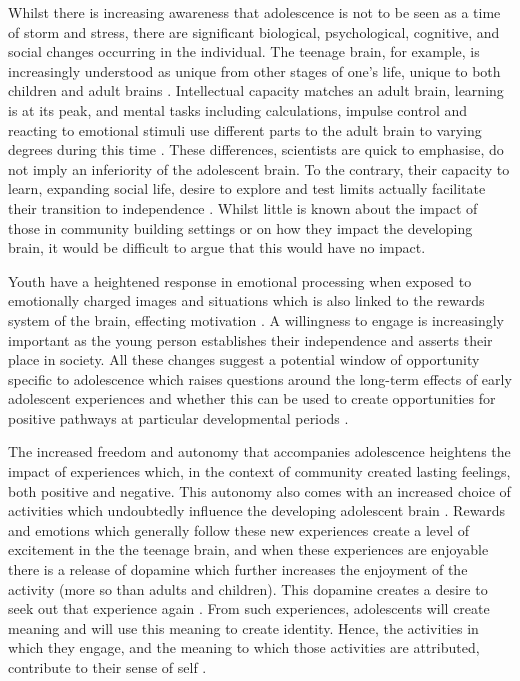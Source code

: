 Whilst there is increasing awareness that adolescence is not to be seen as a time of storm and stress, there are significant biological, psychological, cognitive, and social changes occurring in the individual. The teenage brain, for example, is increasingly understood as unique from other stages of one's life, unique to both children and adult brains \citep{Blakemore2012}. Intellectual capacity matches an adult brain, learning is at its peak, and mental tasks including calculations, impulse control and reacting to emotional stimuli use different parts to the adult brain to varying degrees during this time \citep{NationalInstituteofMentalHealth2011}. These differences, scientists are quick to emphasise, do not imply an inferiority of the adolescent brain. To the contrary, their capacity to learn, expanding social life, desire to explore and test limits actually facilitate their transition to independence \citep{NationalInstituteofMentalHealth2011}. Whilst little is known about the impact of those in community building settings or on how they impact the developing brain, it would be difficult to argue that this would have no impact. 

Youth have a heightened response in emotional processing when exposed to emotionally charged images and situations which is also linked to the rewards system of the brain, effecting motivation \citep{NationalInstituteofMentalHealth2011}. A willingness to engage is increasingly important as the young person establishes their independence and asserts their place in society. All these changes suggest a potential window of opportunity specific to adolescence which raises questions around the long-term effects of early adolescent experiences and whether this can be used to create opportunities for positive pathways at particular developmental periods \citep{Dahl2004}. 

The increased freedom and autonomy that accompanies adolescence heightens the impact of experiences which, in the context of community created lasting feelings, both positive and negative. This autonomy also comes with an increased choice of activities which undoubtedly influence the developing adolescent brain \citep{Kuhn2006}. Rewards and emotions which generally follow these new experiences create a level of excitement in the the teenage brain, and when these experiences are enjoyable there is a release of dopamine which further increases the enjoyment of the activity (more so than adults and children). This dopamine creates a desire to seek out that experience again \citep{Galvan2013}. From such experiences, adolescents will create meaning and will use this meaning to create identity. Hence, the activities in which they engage, and the meaning to which those activities are attributed, contribute to their sense of self \citep{Kuhn2006}. 


